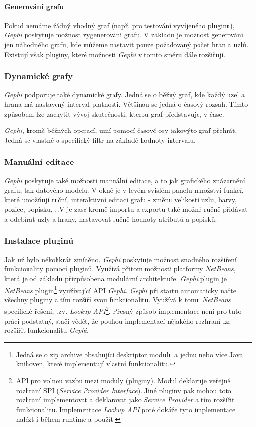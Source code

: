 \documentclass[thesis=M,czech]{FITthesis}[2014/05/6]
\begin{document}
\paragraph{Generování grafu}
Pokud nemáme žádný vhodný graf (např. pro testování vyvíjeného pluginu), \textit{Gephi} poskytuje možnost vygenerování grafu. V základu je možnost generování jen náhodného grafu, kde můžeme
nastavit pouze požadovaný počet hran a uzlů. Existují však pluginy, které možnosti \textit{Gephi} v tomto směru dále rozšiřují.

\subsubsection{Dynamické grafy}
\textit{Gephi} podporuje také dynamické grafy. Jedná se o běžný graf, kde každý uzel a hrana má nastavený interval platnosti. Většinou se jedná o časový rozsah.
Tímto způsobem lze zachytit vývoj skutečnosti, kterou graf představuje, v čase.

\textit{Gephi}, kromě běžných operací, umí pomocí časové osy takovýto graf přehrát. Jedná se vlastně o specifický filtr na základě hodnoty intervalu.

\subsubsection{Manuální editace}
\textit{Gephi} poskytuje také možnosti manuální editace, a to jak grafického znázornění grafu, tak datového modelu. V okně  je v levém svislém panelu množství funkcí, které 
umožňují ruční, interaktivní editaci grafu - změnu velikosti uzlu, barvy, pozice, popisku, \ldots V  je zase kromě importu a exportu také možné ručně přidávat a odebírat
uzly a hrany, nastavovat ručně hodnoty atributů a popisků.

\subsubsection{Instalace pluginů}\label{part:instalace-pluginu}
Jak už bylo několikrát zmíněno, \textit{Gephi} poskytuje možnost snadného rozšíření funkcionality pomocí pluginů. Využívá přitom možností platformy \textit{NetBeans},
která je od základu přizpůsobena modulární architektuře. \textit{Gephi} plugin je \textit{NetBeans} plugin\footnote{Jedná se o zip archive obsahující deskriptor modulu a jednu 
nebo více Java knihoven, které implementují vlastní funkcionalitu.} využívající API \textit{Gephi}. \textit{Gephi} při startu automaticky načte všechny pluginy a tím rozšíří 
svou funkcionalitu. Využívá k tomu \textit{NetBeans} specifické řešení, tzv. \textit{Lookup API}\footnote{API pro volnou vazbu mezi moduly (pluginy). 
Modul deklaruje veřejné rozhraní SPI (\textit{Service Provider Interface}). Jiné pluginy pak mohou toto rozhraní implementovat
a deklarovat jako \textit{Service Provider} a tím rozšířit funkcionalitu. Implementace \textit{Lookup API} poté dokáže tyto implementace nalézt i během runtime a použít.}.  
Přesný způsob implementace není pro tuto práci podstatný, stačí vědět, že pouhou implementací nějakého rozhraní lze rozšířit funkcionalitu \textit{Gephi}. 
 
\end{document}
